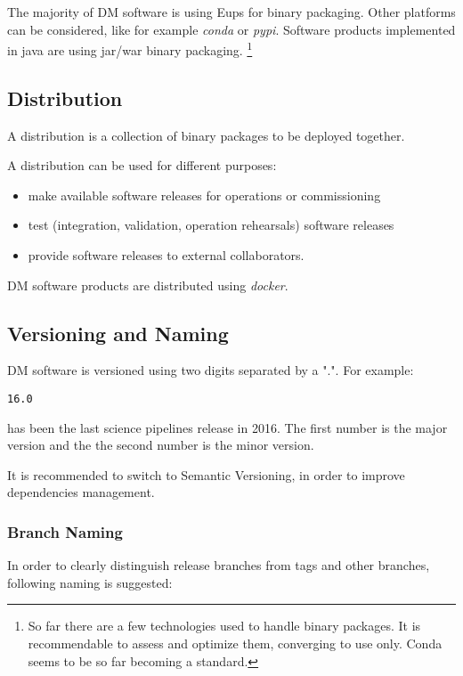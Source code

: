 The majority of DM software is using Eups for binary packaging. Other platforms can be considered, like for example \textit{conda} or \textit{pypi}.
Software products implemented in java are using jar/war binary packaging.
\footnote{So far there are a few technologies used to handle binary packages. It is recommendable to assess and optimize them, converging to use only. 
Conda seems to be so far becoming a standard.}

\subsection{Distribution} \label{sect:distribution}

A distribution is a collection of binary packages to be deployed together.

A distribution can be used for different purposes:

\begin{itemize}
\item make available software releases for operations or commissioning
\item test (integration, validation, operation rehearsals) software releases
\item provide software releases to external collaborators.
\end{itemize}

DM software products are distributed using \textit{docker}.


\newpage
\subsection{Versioning and Naming} \label{sect:versioning}

DM software is versioned using two digits separated by a ".".
For example:

\begin{verbatim}
16.0
\end{verbatim}

has been the last science pipelines release in 2016. The first number is the major version and the the second number is the minor version. 


It is recommended to switch to Semantic Versioning, in order to improve dependencies management.


\subsubsection{Branch Naming}

In order to clearly distinguish release branches from tags and other branches, following naming is suggested:

